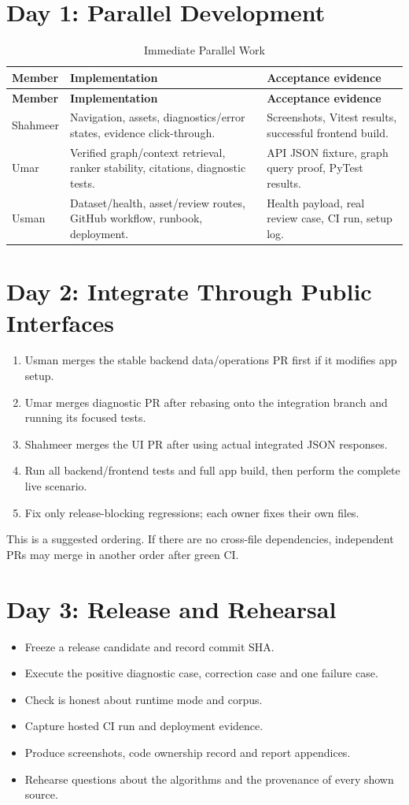 \documentclass[11pt,a4paper,oneside]{report}
\newcommand{\task}[1]{\item[$\square$] #1}
\newcommand{\file}[1]{\path{#1}}
\begin{document}
\section{Day 1: Parallel Development}
\begin{longtable}{P{2.2cm}P{5cm}P{4.9cm}}
\caption{Immediate Parallel Work}\\\toprule\textbf{Member} & \textbf{Implementation} & \textbf{Acceptance evidence}\\\midrule\endfirsthead\toprule\textbf{Member} & \textbf{Implementation} & \textbf{Acceptance evidence}\\\midrule\endhead
Shahmeer & Navigation, assets, diagnostics/error states, evidence click-through. & Screenshots, Vitest results, successful frontend build.\\
Umar & Verified graph/context retrieval, ranker stability, citations, diagnostic tests. & API JSON fixture, graph query proof, PyTest results.\\
Usman & Dataset/health, asset/review routes, GitHub workflow, runbook, deployment. & Health payload, real review case, CI run, setup log.\\
\bottomrule\end{longtable}

\section{Day 2: Integrate Through Public Interfaces}
\begin{enumerate}
\item Usman merges the stable backend data/operations PR first if it modifies app setup.
\item Umar merges diagnostic PR after rebasing onto the integration branch and running its focused tests.
\item Shahmeer merges the UI PR after using actual integrated JSON responses.
\item Run all backend/frontend tests and full app build, then perform the complete live scenario.
\item Fix only release-blocking regressions; each owner fixes their own files.
\end{enumerate}
This is a suggested ordering. If there are no cross-file dependencies, independent PRs may merge in another order after green CI.

\section{Day 3: Release and Rehearsal}
\begin{itemize}
\task{Freeze a release candidate and record commit SHA.}
\task{Execute the positive diagnostic case, correction case and one failure case.}
\task{Check \file{/api/health} is honest about runtime mode and corpus.}
\task{Capture hosted CI run and deployment evidence.}
\task{Produce screenshots, code ownership record and report appendices.}
\task{Rehearse questions about the algorithms and the provenance of every shown source.}
\end{itemize}
\end{document}
